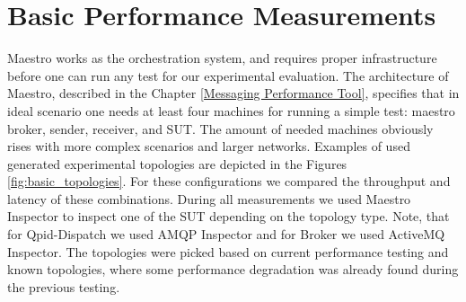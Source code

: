 \section{Basic Performance Measurements}
\label{Basic Performance Measurements}
Maestro works as the orchestration system, and requires proper infrastructure before one can run any test for our experimental evaluation. The architecture of Maestro, described in the Chapter \ref{Messaging Performance Tool}, specifies that in ideal scenario one needs at least four machines for running a simple test: maestro broker, sender, receiver, and SUT. The amount of needed machines obviously rises with more complex scenarios and larger networks. Examples of used generated experimental topologies are depicted in the Figures \ref{fig:basic_topologies}. For these configurations we compared the throughput and latency of these combinations. During all measurements we used Maestro Inspector to inspect one of the SUT depending on the topology type. Note, that for Qpid-Dispatch we used AMQP Inspector and for Broker we used ActiveMQ Inspector. The topologies were picked based on current performance testing and known topologies, where some performance degradation was already found during the previous testing.


